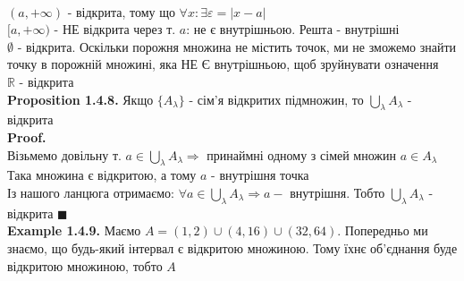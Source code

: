 \documentclass[a4paper, 14pt]{extarticle}
\def\huge{\displaystyle}
\def\bigline{\vspace{5mm}\\}
\def\ex#1{\textbf{Example {#1}}}
\def\prp#1{\textbf{Proposition {#1}}}
\def\proof{\textbf{Proof.}\\}
\def\bigline{\vspace{5mm}\\}
\def\qed{$\blacksquare$}
\begin{document}
\bigline
$(a,+\infty)$ - відкрита, тому що $\forall x: \exists \varepsilon = |x-a|$
\bigline
$[a,+\infty)$ - НЕ відкрита через т. $a$: не є внутрішньою. Решта - внутрішні
\bigline
$\emptyset$ - відкрита. Оскільки порожня множина не містить точок, ми не зможемо знайти точку в порожній множині, яка НЕ Є внутрішньою, щоб зруйнувати означення
\bigline
$\mathbb{R}$ - відкрита
\bigline
\prp{1.4.8.} Якщо $\{A_{\lambda}\}$ - сім'я відкритих підмножин, то $\huge \bigcup_{\lambda} A_{\lambda}$ - відкрита\\
\proof
Візьмемо довільну т. $a \in \huge \bigcup_{\lambda} A_{\lambda} \Rightarrow$ принаймні одному з сімей множин $a \in A_{\lambda}$\\
Така множина є відкритою, а тому $a$ - внутрішня точка\\
Із нашого ланцюга отримаємо: $\forall a \in \huge \bigcup_{\lambda} A_{\lambda} \Rightarrow a - $ внутрішня. Тобто $\huge \bigcup_{\lambda} A_{\lambda}$ - відкрита \qed
\bigline
\ex{1.4.9.} Маємо $A = (1,2) \cup (4,16) \cup (32, 64)$. Попередньо ми знаємо, що будь-який інтервал є відкритою множиною. Тому їхнє об'єднання буде відкритою множиною, тобто $A$
\bigline
\end{document}
